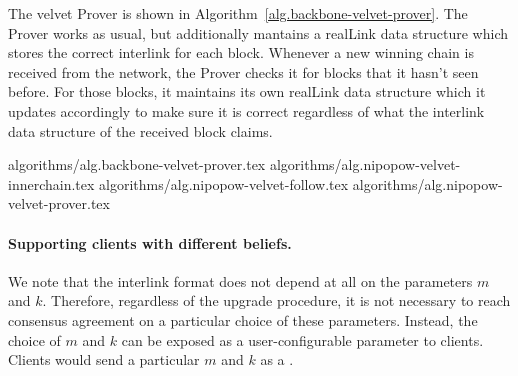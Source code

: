 The velvet Prover is shown in Algorithm~\ref{alg.backbone-velvet-prover}. The
Prover works as usual, but additionally mantains a realLink data structure
which stores the correct interlink for each block. Whenever a new winning chain
is received from the network, the Prover checks it for blocks that it hasn't
seen before. For those blocks, it maintains its own realLink data structure
which it updates accordingly to make sure it is correct regardless of what the
interlink data structure of the received block claims.

{algorithms/alg.backbone-velvet-prover.tex}
{algorithms/alg.nipopow-velvet-innerchain.tex}
{algorithms/alg.nipopow-velvet-follow.tex}
{algorithms/alg.nipopow-velvet-prover.tex}

\paragraph{Supporting clients with different beliefs.}
We note that the interlink format does not depend at all on the parameters $m$ and $k$.
Therefore, regardless of the upgrade procedure, it is not necessary to reach consensus agreement on a particular choice of these parameters. Instead, the choice of $m$ and $k$ can be exposed as a user-configurable parameter to clients. Clients would send a particular $m$ and $k$ as a .

